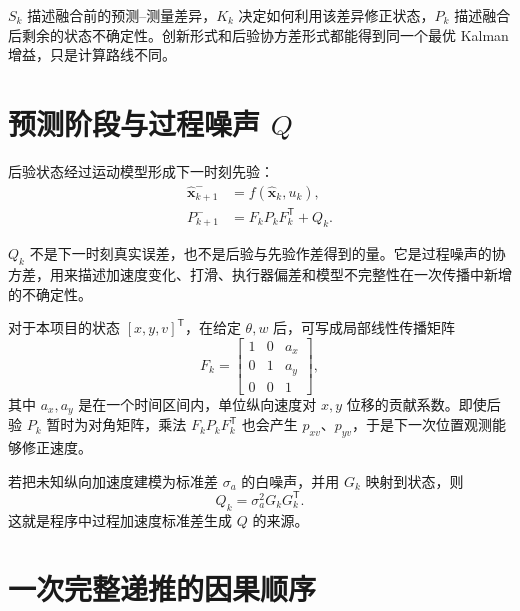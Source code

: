 \documentclass[UTF8,a4paper,11pt]{ctexart}
\newcommand{\prior}{^{-}}
\newcommand{\transpose}{^{\mathsf T}}
\begin{document}
\begin{keybox}
$S_k$ 描述融合前的预测--测量差异，$K_k$ 决定如何利用该差异修正状态，$P_k$ 描述融合后剩余的状态不确定性。创新形式和后验协方差形式都能得到同一个最优 Kalman 增益，只是计算路线不同。
\end{keybox}

\section{预测阶段与过程噪声 \texorpdfstring{$Q$}{Q}}

后验状态经过运动模型形成下一时刻先验：
\begin{align}
\hat{\bm x}_{k+1}\prior&=f(\hat{\bm x}_k,u_k),\\
P_{k+1}\prior&=F_kP_kF_k\transpose+Q_k.
\end{align}

$Q_k$ 不是下一时刻真实误差，也不是后验与先验作差得到的量。它是过程噪声的协方差，用来描述加速度变化、打滑、执行器偏差和模型不完整性在一次传播中新增的不确定性。

对于本项目的状态 $[x,y,v]\transpose$，在给定 $\theta,w$ 后，可写成局部线性传播矩阵
\begin{equation}
F_k=
\begin{bmatrix}
1&0&a_x\\
0&1&a_y\\
0&0&1
\end{bmatrix},
\end{equation}
其中 $a_x,a_y$ 是在一个时间区间内，单位纵向速度对 $x,y$ 位移的贡献系数。即使后验 $P_k$ 暂时为对角矩阵，乘法 $F_kP_kF_k\transpose$ 也会产生 $p_{xv}$、$p_{yv}$，于是下一次位置观测能够修正速度。

若把未知纵向加速度建模为标准差 $\sigma_a$ 的白噪声，并用 $G_k$ 映射到状态，则
\begin{equation}
Q_k=\sigma_a^2G_kG_k\transpose.
\end{equation}
这就是程序中过程加速度标准差生成 $Q$ 的来源。

\section{一次完整递推的因果顺序}
\end{document}
